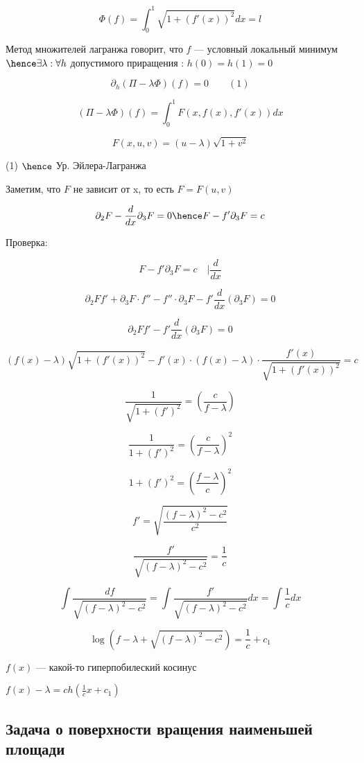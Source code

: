 \[
    \Phi(f) = \int_0^1 \sqrt{1 + (f'(x))^2} dx = l
\]


Метод множителей лагранжа говорит, что
$f$ --- условный локальный минимум 
$\hence \exists \lambda : \forall h$ 
допустимого приращения : $h(0) = h(1) = 0$ 

\[
    \partial_h (\Pi - \lambda \Phi)(f) = 0  \quad \quad (1)
\]

\[
    (\Pi - \lambda \Phi)(f) = \int_0^1 F(x, f(x), f'(x)) dx
\]

\[
    F(x, u, v) = (u - \lambda) \sqrt{1 + v ^ 2}
\]

(1) $\hence$ Ур. Эйлера-Лагранжа

Заметим, что $F$ не зависит от x, то есть $F = F(u, v)$

\[
    \partial_2 F - \frac{d}{dx} \partial_3 F = 0 \hence F - f' \partial_3 F = c
\]

Проверка:

\[
    F - f' \partial_3 F = c \quad \bigg | \frac{d}{dx}
\]

\[
    \partial_2 F f' + \partial_3 F \cdot f'' - f'' \cdot \partial_3 F - f' \frac{d}{dx}(\partial_3 F) = 0
\]


\[
    \partial_2 F f' - f' \frac{d}{dx}(\partial_3 F) = 0
\]

\[
    (f(x) - \lambda) \sqrt{1 + (f'(x)) ^ 2} - f'(x) \cdot (f(x) - \lambda) \cdot \frac{f'(x)}{\sqrt{1 + (f'(x)) ^ 2}} = c
\]

\[
    \frac{1}{\sqrt{1 + (f')^2}} = (\frac{c}{f - \lambda})
\]


\[
    \frac{1}{1 + (f')^2} = (\frac{c}{f - \lambda}) ^ 2
\]

\[
    1 + (f') ^ 2 = (\frac{f - \lambda}{c}) ^ 2
\]

\[
    f' = \sqrt{\frac{(f -  \lambda)  ^ 2 - c ^ 2}{c ^ 2}}
\]

\[
    \frac{f'}{\sqrt{(f - \lambda) ^ 2 - c ^ 2}} = \frac{1}{c}
\]

\[
    \int \frac{df}{\sqrt{(f - \lambda) ^ 2 - c ^ 2}}= \int \frac{f'}{\sqrt{(f - \lambda) ^ 2 - c ^ 2}} dx = \int \frac{1}{c} dx
\]

\[
    \log(f - \lambda + \sqrt{(f - \lambda) ^ 2 - c ^ 2}) = \frac{1}{c} + c_1
\]


$f(x)$ --- какой-то гиперпобилеский косинус

$f(x) - \lambda = ch(\frac{1}{c} x + c_1)$


\subsection{Задача о поверхности вращения наименьшей площади}



